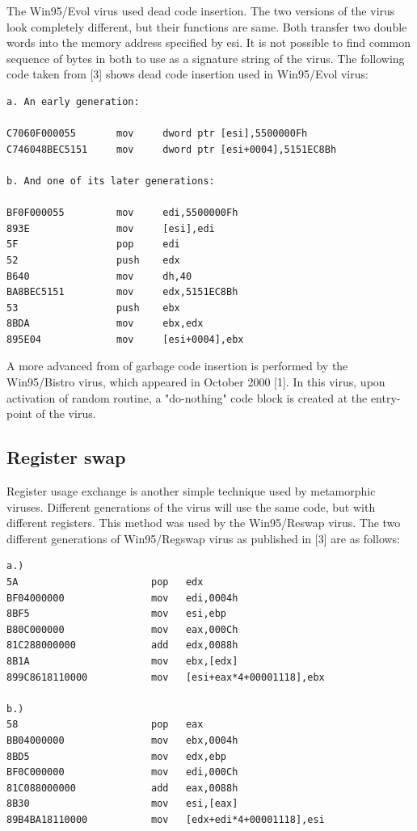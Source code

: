 The Win95/Evol virus used dead code insertion. The two versions of the virus look completely different, but their functions are same. Both transfer two double words into the memory address specified by esi. It is not possible to find common sequence of bytes in both to use as a signature string of the virus. The following code taken from [3] shows dead code insertion used in Win95/Evol virus:

\begin{verbatim}
a. An early generation:

C7060F000055       mov     dword ptr [esi],5500000Fh
C746048BEC5151     mov     dword ptr [esi+0004],5151EC8Bh

b. And one of its later generations:

BF0F000055         mov     edi,5500000Fh
893E               mov     [esi],edi
5F                 pop     edi
52                 push    edx
B640               mov     dh,40
BA8BEC5151         mov     edx,5151EC8Bh
53                 push    ebx
8BDA               mov     ebx,edx
895E04             mov     [esi+0004],ebx
\end{verbatim}

A more advanced from of garbage code insertion is performed by the Win95/Bistro virus, which appeared in October 2000 [1]. In this virus, upon activation of random routine, a "do-nothing" code block is created at the entry-point of the virus.   

\subsection{Register swap}
Register usage exchange is another simple technique used by metamorphic viruses. Different generations of the virus will use the same code, but with different registers. This method was used by the Win95/Reswap virus. The two different generations of Win95/Regswap virus as published in [3] are as follows:

\begin{verbatim}
a.)
5A                       pop   edx
BF04000000               mov   edi,0004h
8BF5                     mov   esi,ebp
B80C000000               mov   eax,000Ch
81C288000000             add   edx,0088h
8B1A                     mov   ebx,[edx]
899C8618110000           mov   [esi+eax*4+00001118],ebx

b.)
58                       pop   eax
BB04000000               mov   ebx,0004h
8BD5                     mov   edx,ebp
BF0C000000               mov   edi,000Ch
81C088000000             add   eax,0088h
8B30                     mov   esi,[eax]
89B4BA18110000           mov   [edx+edi*4+00001118],esi
\end{verbatim}

